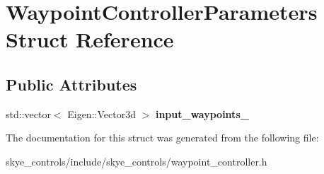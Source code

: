 \hypertarget{struct_waypoint_controller_parameters}{\section{Waypoint\-Controller\-Parameters Struct Reference}
\label{struct_waypoint_controller_parameters}
}
\subsection*{Public Attributes}
\begin{DoxyCompactItemize}
\item 
\hypertarget{struct_waypoint_controller_parameters_a231e6d7a6e9619bbfa6745460e4e132c}{std\-::vector$<$ Eigen\-::\-Vector3d $>$ {\bfseries input\-\_\-waypoints\-\_\-}}\label{struct_waypoint_controller_parameters_a231e6d7a6e9619bbfa6745460e4e132c}

\end{DoxyCompactItemize}


The documentation for this struct was generated from the following file\-:\begin{DoxyCompactItemize}
\item 
skye\-\_\-controls/include/skye\-\_\-controls/waypoint\-\_\-controller.\-h\end{DoxyCompactItemize}
